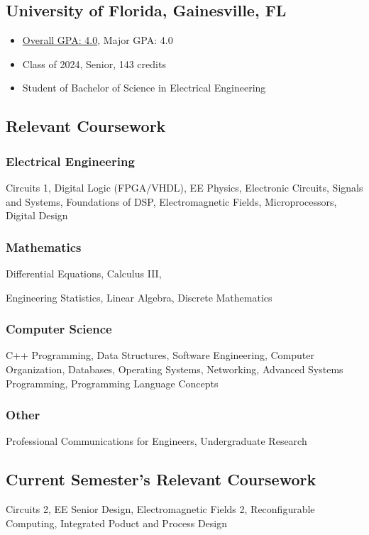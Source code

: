 \documentclass{article}
\newcommand\halftextbox[1]{%
  \parbox[t]{.475\textwidth}{#1}%
}
\newcommand\spacetextbox[1]{%
  \parbox{.05\textwidth}{#1}%
}
\newenvironment{CustomItemize}
{ \begin{itemize}[leftmargin=1em]
    \setlength{\itemsep}{0pt}
    \setlength{\parskip}{0pt}
    \setlength{\parindent}{0pt}
    \setlength{\parsep}{0pt}     }
{ \end{itemize}                  }
\begin{document}
\noindent
\halftextbox{
\begin{raggedright}
\subsection{University of Florida,  Gainesville, FL}
\begin{CustomItemize}
\item \underline{Overall GPA: 4.0}, Major GPA: 4.0
\item Class of 2024, Senior, 143 credits
\item Student of Bachelor of Science in Electrical Engineering
\end{CustomItemize}

\subsection{Relevant Coursework}
\subsubsection{Electrical Engineering}
Circuits 1,
Digital Logic (FPGA/VHDL),
EE Physics,
Electronic Circuits,
Signals and Systems,
Foundations of DSP,
Electromagnetic Fields,
Microprocessors,
Digital Design
\subsubsection{Mathematics}
Differential Equations,
Calculus III,
\end{raggedright}
}
\spacetextbox{\hfil\hfil}
\halftextbox{
\begin{raggedright}
Engineering Statistics, 
Linear Algebra,
Discrete Mathematics
\subsubsection{Computer Science}
C++ Programming,
Data Structures,
Software Engineering,
Computer Organization,
Databases,
Operating Systems,
Networking,
Advanced Systems Programming,
Programming Language Concepts

\subsubsection{Other}
Professional Communications for Engineers,
Undergraduate Research

\end{raggedright}
\subsection{Current Semester's Relevant Coursework}
Circuits 2,
EE Senior Design,
Electromagnetic Fields 2,
Reconfigurable Computing,
Integrated Poduct and Process Design
}
\end{document}
